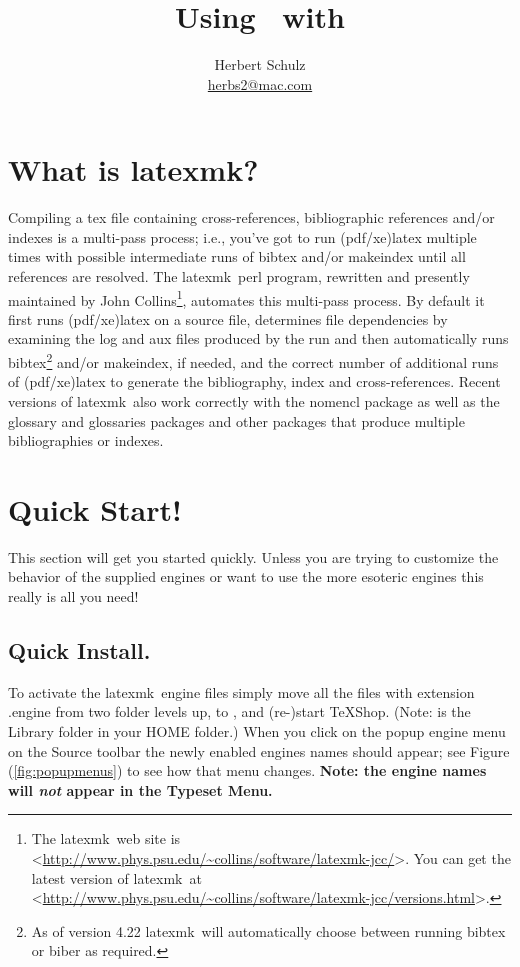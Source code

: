 \documentclass[11pt]{article}
\title{Using \latexmk\ with \TS}
\author{Herbert Schulz\\\small\href{mailto:herbs2@mac.com}{herbs2@mac.com}}
\date{}
\newcommand{\mnu}[1]{\textsf{#1}}
\newcommand{\cmd}[1]{\textsf{#1}}
\newcommand{\TS}{\textsf{\TeX Shop}}
\newcommand{\latexmk}{\textsf{latexmk}}
\begin{document}
\maketitle
\thispagestyle{empty}
\section{What is \latexmk?}
Compiling a \cmd{tex} file containing cross-references, bibliographic references and/or indexes is a multi-pass process; i.e., you've got to run \cmd{(pdf/xe)latex} multiple times with possible intermediate runs of \cmd{bibtex} and/or \cmd{makeindex} until all references are resolved. The \latexmk\ \cmd{perl} program, rewritten and presently maintained by John Collins\footnote{The \latexmk\ web site is <\url{http://www.phys.psu.edu/~collins/software/latexmk-jcc/}>. You can get the latest version of \latexmk\ at <\url{http://www.phys.psu.edu/~collins/software/latexmk-jcc/versions.html}>.}, automates this multi-pass process. By default it first runs \cmd{(pdf/xe)latex} on a source file, determines file dependencies by examining the \cmd{log} and \cmd{aux} files produced by the run and then automatically runs \cmd{bibtex}\footnote{As of version 4.22 \latexmk\ will automatically choose between running \cmd{bibtex} or \cmd{biber} as required.} and/or \cmd{makeindex}, if needed, and the correct number of additional runs of \cmd{(pdf/xe)latex} to generate the bibliography, index and cross-references. Recent versions of \latexmk\ also work correctly with the \cmd{nomencl} package as well as the  \cmd{glossary} and \cmd{glossaries} packages and other packages that produce multiple bibliographies or indexes.

\section{Quick Start!}

This section will get you started quickly. Unless you are trying to customize the behavior of the supplied engines or want to use the more esoteric engines this really is all you need!

\subsection{Quick Install.}

To activate the \latexmk\ \cmd{engine} files simply move all the files with extension \cmd{.engine} from  two folder levels up, to , and (re-)start \TS. (Note:  is the \cmd{Library} folder in your \cmd{HOME} folder.) When you click on the popup engine menu on the Source toolbar the newly enabled engines names should appear; see Figure (\ref{fig:popupmenus}) to see how that menu changes. \textbf{Note: the engine names will \emph{not} appear in the \mnu{Typeset} Menu.}
\end{document}
